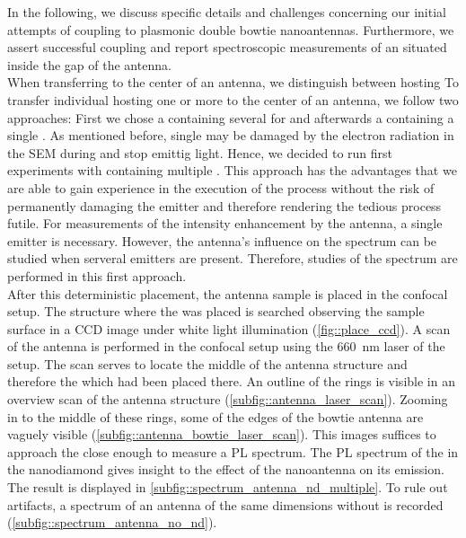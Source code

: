 			In the following, we discuss specific details and challenges concerning our initial attempts of coupling \sivs to plasmonic double bowtie nanoantennas. Furthermore, we assert successful coupling and report spectroscopic measurements of an \siv situated inside the gap of the antenna.
			\\
			When transferring \nds to the center of an antenna, we distinguish between \nds hosting
			To transfer individual \nds hosting one or more \sivs to the center of an antenna, we follow two approaches:
			First we chose a \nd containing several \sivs for \pp and afterwards a \nd containing a single \siv.
			As mentioned before, single \sivs may be damaged by the electron radiation in the SEM during \pp and stop emittig \pl light.
			Hence, we decided to run first experiments with \nds containing multiple \sivs.
			This approach has the advantages that we are able to gain experience in the execution of the \pp process without the risk of permanently damaging the emitter and therefore rendering the tedious \pp process futile.
			For measurements of the intensity enhancement by the antenna, a single emitter is necessary.
			However, the antenna's influence on the \siv spectrum can be studied when serveral emitters are present.
			Therefore, studies of the spectrum are performed in this first approach.
			\\
			After this deterministic placement, the antenna sample is placed in the confocal setup.
			The structure where the \nd was placed is searched observing the sample surface in a CCD image under white light illumination (\cref{fig::place_ccd}).
			A scan of the antenna is performed in the confocal setup using the \SI{660}{nm} \cw laser of the setup.
			The scan serves to locate the middle of the antenna structure and therefore the \nd which had been placed there.
			An outline of the rings is visible in an overview scan of the antenna structure (\cref{subfig::antenna_laser_scan}).
			Zooming in to the middle of these rings, some of the edges of the bowtie antenna are vaguely visible (\cref{subfig::antenna_bowtie_laser_scan}).
			This images suffices to approach the \nd close enough to measure a PL spectrum.
			The PL spectrum of the \siv in the nanodiamond gives insight to the effect of the nanoantenna on its emission.
			The result is displayed in \cref{subfig::spectrum_antenna_nd_multiple}.
			To rule out artifacts, a spectrum of an antenna of the same dimensions without \nd is recorded (\cref{subfig::spectrum_antenna_no_nd}).
